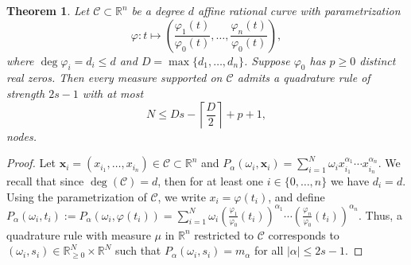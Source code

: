 \documentclass[11pt,a4paper]{amsart}
\numberwithin{equation}{section}
\newtheorem{thm}{Theorem}
\theoremstyle{definition}
\newcommand{\R}{\mathbb{R}}
\newcommand{\xx}{\mathbf{x}}
\numberwithin{thm}{section}
\theoremstyle{break}
\numberwithin{subcase}{case}
\begin{document}
\begin{thm}\label{thm:quadraturerational}
    Let $\mathcal C\subset \mathbb R^n$ be a degree $d$ affine rational curve with parametrization $$\varphi:t\mapsto \left(\frac{\varphi_1(t)}{\varphi_0(t)},\dots,\frac{\varphi_n(t)}{\varphi_0(t)}\right),$$ where $\deg \varphi_i=d_i\leq d$ and $D=\max\{d_1,\dots,d_n\}$. Suppose $\varphi_0$ has $p\geq 0$ distinct real zeros. Then every measure supported on $\mathcal C$ admits a quadrature rule of strength $2s-1$ with at most $$N\leq Ds-\left\lceil \frac{D}{2}\right\rceil+p+1,$$
    nodes.
\end{thm}
\begin{proof}
    Let $\xx_i=(x_{i_1},\dots,x_{i_n})\in\mathcal C\subset\R^n$ and $P_\alpha(\omega_i,\xx_i)=\sum_{i=1}^N\omega_ix_{i_1}^{\alpha_1}\cdots x_{i_n}^{\alpha_n}$. We recall that since $\deg(\mathcal C)=d$, then for at least one $i\in\{0,\dots,n\}$ we have $d_i=d$. {Using the parametrization of $\mathcal C$, we write $x_i = \varphi(t_i)$, and define $P_\alpha(\omega_i, t_i) := P_\alpha(\omega_i, \varphi(t_i)) =\sum_{i=1}^N\omega_i\left(\frac{\varphi_1}{\varphi_0}(t_i)\right)^{\alpha_1}\cdots\left(\frac{\varphi_n}{\varphi_0}(t_i)\right)^{\alpha_n}$. Thus, a quadrature rule with measure $\mu$ in $\R^n$ restricted to $\mathcal C$ corresponds to $(\omega_i,s_i)\in \R^N_{\geq 0}\times \R^N$ such that $P_{\alpha}(\omega_i,s_i)=m_\alpha$ for all $|\alpha|\leq 2s-1$.} 
    

\end{proof}
\end{document}
